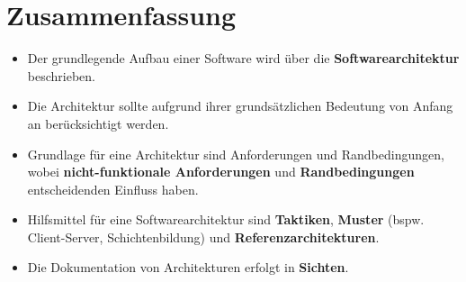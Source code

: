\section{Zusammenfassung}


\begin{itemize}
    \item Der grundlegende Aufbau einer Software wird über die \textbf{Softwarearchitektur} beschrieben.
    \item Die Architektur sollte aufgrund ihrer grundsätzlichen Bedeutung von Anfang an berücksichtigt werden.
    \item Grundlage für eine Architektur sind Anforderungen und Randbedingungen, wobei \textbf{nicht-funktionale Anforderungen} und \textbf{Randbedingungen} entscheidenden Einfluss haben.
    \item Hilfsmittel für eine Softwarearchitektur sind \textbf{Taktiken}, \textbf{Muster} (bspw. Client-Server, Schichtenbildung) und \textbf{Referenzarchitekturen}.
    \item Die Dokumentation von Architekturen erfolgt in \textbf{Sichten}.
\end{itemize}